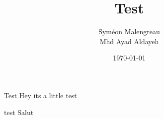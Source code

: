 \documentclass{beamer}
\title{Test}
\author{Syméon Malengreau\\Mhd Ayad Aldayeh}
\date{\today}
\begin{document}
\begin{frame}
\titlepage
\end{frame}

\begin{frame}{Test}
Hey its a little test
\begin{definition}{test}
Salut
\end{definition}
\end{frame}
\end{document}
